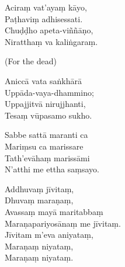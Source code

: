 Aciraṃ vat'ayaṃ kāyo,\\
Paṭhaviṃ adhisessati.\\
Chuḍḍho apeta-viññāṇo,\\
Niratthaṃ va kaliṅgaraṃ. 

(For the dead)

Aniccā vata saṅkhārā\\
Uppāda-vaya-dhammino;\\
Uppajjitvā nirujjhanti,\\
Tesaṃ vūpasamo sukho. 

Sabbe sattā maranti ca\\
Mariṃsu ca marissare\\
Tath'evāhaṃ marissāmi\\
N'atthi me ettha saṃsayo.

Addhuvaṃ jīvitaṃ,\\
Dhuvaṃ maraṇaṃ,\\
Avassaṃ mayā maritabbaṃ\\
Maraṇapariyosānaṃ me jīvitaṃ.\\
Jīvitam m'eva aniyataṃ,\\
Maraṇaṃ niyataṃ,\\
Maraṇaṃ niyataṃ. 


